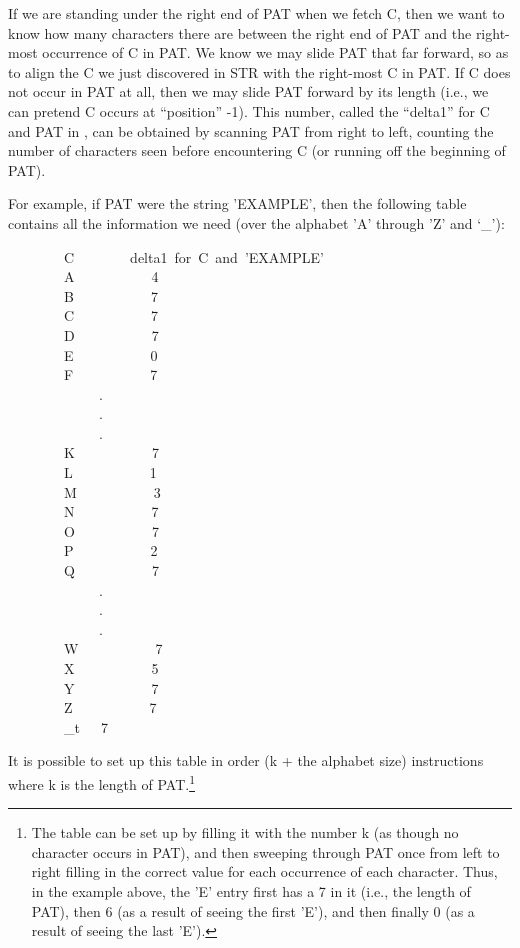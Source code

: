 \documentclass[10pt]{book}
\newenvironment{pubasis}{\begin{flushleft}}{\end{flushleft}}
\begin{document}
If we are standing under the right end of PAT when we fetch C,
then we want to know how many characters there are between
the right end of PAT and the right-most occurrence of C in PAT.
We know we may slide PAT that far forward, so as to align the C we
just discovered in STR with the right-most C in PAT.
If C does not occur in PAT at all, then we may slide PAT forward
by its length (i.e., we can pretend C occurs at ``position'' -1).
This number, called the ``delta1'' for C and PAT in \cite{FSTRPOS},
can be obtained by scanning PAT from right to left, counting
the number of characters seen before encountering C (or running off the
beginning of PAT).

For example, if PAT were the string 'EXAMPLE', then the
following table contains all the information we need (over the alphabet 'A' through 'Z' and `\_'):
\begin{pubasis}
~~~~~~~~C~~~~~~~~delta1~for~C~and~'EXAMPLE'\\

~~~~~~~~A~~~~~~~~~~~4\\
~~~~~~~~B~~~~~~~~~~~7\\
~~~~~~~~C~~~~~~~~~~~7\\
~~~~~~~~D~~~~~~~~~~~7\\
~~~~~~~~E~~~~~~~~~~~0\\
~~~~~~~~F~~~~~~~~~~~7\\
~~~~~~~~~~~~~.\\
~~~~~~~~~~~~~.\\
~~~~~~~~~~~~~.\\
~~~~~~~~K~~~~~~~~~~~7\\
~~~~~~~~L~~~~~~~~~~~1\\
~~~~~~~~M~~~~~~~~~~~3\\
~~~~~~~~N~~~~~~~~~~~7\\
~~~~~~~~O~~~~~~~~~~~7\\
~~~~~~~~P~~~~~~~~~~~2\\
~~~~~~~~Q~~~~~~~~~~~7\\
~~~~~~~~~~~~~.\\
~~~~~~~~~~~~~.\\
~~~~~~~~~~~~~.\\
~~~~~~~~W~~~~~~~~~~~7\\
~~~~~~~~X~~~~~~~~~~~5\\
~~~~~~~~Y~~~~~~~~~~~7\\
~~~~~~~~Z~~~~~~~~~~~7\\
~~~~~~~~\_t~~~7\\
\end{pubasis}
It is possible to set up this table in order (k + the alphabet size)
instructions where
k is the length of PAT.\footnote{The table can be set up by filling it with the number k (as though no character occurs in PAT), and then sweeping through PAT once from left to right filling in the correct value for each occurrence of each character.  Thus, in the example above, the 'E' entry first has a 7 in it (i.e., the length of PAT), then 6 (as a result of seeing the first 'E'), and then finally 0 (as a result of seeing the last 'E').}
\end{document}
